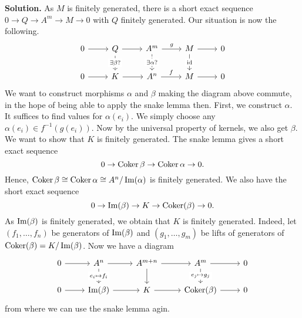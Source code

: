 \documentclass[a4paper,11pt]{article}
\begin{document}
\textbf{Solution.}
As $M$ is finitely generated, there is a short exact sequence 
$0 \to Q \to A^m \to M \to 0$ with $Q$ finitely generated. 
Our situation is now the following.
\[\begin{tikzcd}[ampersand replacement=\&]
	0 \& Q \& {A^m} \& M \& 0 \\
	0 \& K \& {A^n} \& M \& 0
	\arrow[from=1-1, to=1-2]
	\arrow[from=1-2, to=1-3]
	\arrow["g", from=1-3, to=1-4]
	\arrow[from=1-4, to=1-5]
	\arrow["f", from=2-3, to=2-4]
	\arrow[from=2-4, to=2-5]
	\arrow[from=2-1, to=2-2]
	\arrow["\id"{description}, from=1-4, to=2-4]
	\arrow[from=2-2, to=2-3]
	\arrow["{\exists \alpha?}"{description}, dashed, from=1-3, to=2-3]
	\arrow["{\exists \beta?}"{description}, dashed, from=1-2, to=2-2]
\end{tikzcd} \]
We want to construct morphisms $\alpha$ and $\beta$ making the diagram above commute,
in the hope of being able to apply the snake lemma then. 
First, we construct $\alpha$. It suffices to find values for $\alpha(e_i)$.
We simply choose any $\alpha(e_i) \in f^{-1}(g(e_i))$. Now by the universal
property of kernels, we also get $\beta$. We want to show that $K$ is 
finitely generated. The snake lemma gives a short exact sequence
\begin{equation*}
    0 \to \operatorname{Coker} \beta \to \operatorname{Coker} \alpha \to 0.
\end{equation*}
Hence, $\operatorname{Coker} \beta \cong \operatorname{Coker} \alpha \cong A^n / \operatorname{Im}(\alpha)$ is 
finitely generated. We also have the short exact sequence
\begin{equation*}
    0 \to \operatorname{Im}(\beta) \to K \to \operatorname{Coker}(\beta) \to 0.
\end{equation*}
As $\operatorname{Im}(\beta)$ is finitely generated, we obtain that $K$ is finitely generated.
Indeed, let $(f_1, \dots, f_n)$ be generators of $\operatorname{Im}(\beta)$ and 
$(g_1, \dots, g_m)$ be lifts of generators of $\operatorname{Coker}(\beta) = K/\operatorname{Im}(\beta)$. 
Now we have a diagram
\[\begin{tikzcd}[ampersand replacement=\&]
	0 \& {A^n} \& {A^{m+n}} \& {A^m} \& 0 \\
	0 \& {\img(\beta)} \& K \& {\coker(\beta)} \& 0
	\arrow[from=1-1, to=1-2]
	\arrow[from=1-2, to=1-3]
	\arrow[from=1-3, to=1-4]
	\arrow[from=1-4, to=1-5]
	\arrow[from=2-3, to=2-4]
	\arrow[from=2-4, to=2-5]
	\arrow[from=2-1, to=2-2]
	\arrow["{e_j \mapsto g_j}"{description}, from=1-4, to=2-4]
	\arrow[from=2-2, to=2-3]
	\arrow[from=1-3, to=2-3]
	\arrow["{e_i \mapsto f_i}"{description}, from=1-2, to=2-2]
\end{tikzcd}\]
from where we can use the snake lemma agin.


\contactend
\end{document}
